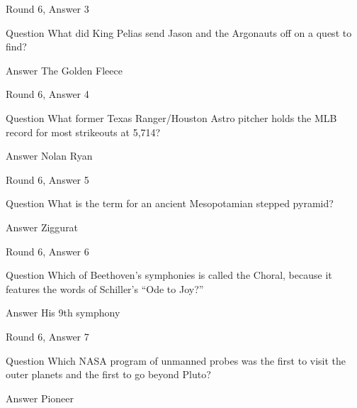 \documentclass[11pt]{beamer}
\begin{document}
\begin{frame}[t]{Round 6, Answer 3}
\vspace{2em}
\begin{block}{Question}
What did King Pelias send Jason and the Argonauts off on a quest to find\@?
\end{block}
\pause{}
\begin{block}{Answer}
The Golden Fleece
\end{block}
\end{frame}
    

\begin{frame}[t]{Round 6, Answer 4}
\vspace{2em}
\begin{block}{Question}
What former Texas Ranger/Houston Astro pitcher holds the MLB record for most strikeouts at 5,714\@?
\end{block}
\pause{}
\begin{block}{Answer}
Nolan Ryan
\end{block}
\end{frame}
    

\begin{frame}[t]{Round 6, Answer 5}
\vspace{2em}
\begin{block}{Question}
What is the term for an ancient Mesopotamian stepped pyramid\@?
\end{block}
\pause{}
\begin{block}{Answer}
Ziggurat
\end{block}
\end{frame}
    

\begin{frame}[t]{Round 6, Answer 6}
\vspace{2em}
\begin{block}{Question}
Which of Beethoven's symphonies is called the Choral, because it features the words of Schiller's ``Ode to Joy?''
\end{block}
\pause{}
\begin{block}{Answer}
His 9th symphony
\end{block}
\end{frame}
    

\begin{frame}[t]{Round 6, Answer 7}
\vspace{2em}
\begin{block}{Question}
Which NASA program of unmanned probes was the first to visit the outer planets and the first to go beyond Pluto\@?
\end{block}
\pause{}
\begin{block}{Answer}
Pioneer
\end{block}
\end{frame}
    
\end{document}
